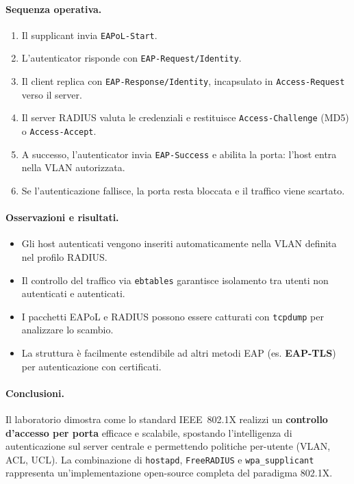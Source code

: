 \paragraph{Sequenza operativa.}
\begin{enumerate}
  \item Il supplicant invia \texttt{EAPoL-Start}.
  \item L’autenticator risponde con \texttt{EAP-Request/Identity}.
  \item Il client replica con \texttt{EAP-Response/Identity}, incapsulato in \texttt{Access-Request} verso il server.
  \item Il server RADIUS valuta le credenziali e restituisce \texttt{Access-Challenge} (MD5) o \texttt{Access-Accept}.
  \item A successo, l’autenticator invia \texttt{EAP-Success} e abilita la porta: l’host entra nella VLAN autorizzata.
  \item Se l’autenticazione fallisce, la porta resta bloccata e il traffico viene scartato.
\end{enumerate}

\paragraph{Osservazioni e risultati.}
\begin{itemize}
  \item Gli host autenticati vengono inseriti automaticamente nella VLAN definita nel profilo RADIUS.
  \item Il controllo del traffico via \texttt{ebtables} garantisce isolamento tra utenti non autenticati e autenticati.
  \item I pacchetti EAPoL e RADIUS possono essere catturati con \texttt{tcpdump} per analizzare lo scambio.
  \item La struttura è facilmente estendibile ad altri metodi EAP (es. \textbf{EAP-TLS}) per autenticazione con certificati.
\end{itemize}

\paragraph{Conclusioni.}
Il laboratorio dimostra come lo standard IEEE~802.1X realizzi
un \textbf{controllo d’accesso per porta} efficace e scalabile,
spostando l’intelligenza di autenticazione sul server centrale
e permettendo politiche per-utente (VLAN, ACL, UCL).
La combinazione di \texttt{hostapd}, \texttt{FreeRADIUS} e
\texttt{wpa\_supplicant} rappresenta un’implementazione open-source
completa del paradigma 802.1X.


